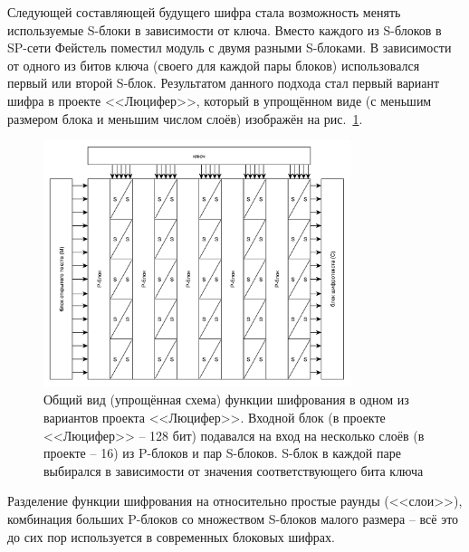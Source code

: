 Следующей составляющей будущего шифра стала возможность менять используемые S-блоки в зависимости от ключа. Вместо каждого из S-блоков в SP-сети Фейстель поместил модуль с двумя разными S-блоками. В зависимости от одного из битов ключа (своего для каждой пары блоков) использовался первый или второй S-блок. Результатом данного подхода стал первый вариант шифра в проекте <<Люцифер>>, который в упрощённом виде (с меньшим размером блока и меньшим числом слоёв) изображён на рис.~\ref{fig:lucifer}.

\begin{figure}[htb]
	\centering
	\includegraphics[width=0.8\textwidth]{pic/lucifer}
  \caption{Общий вид (упрощённая схема) функции шифрования в одном из вариантов проекта <<Люцифер>>. Входной блок (в проекте <<Люцифер>> -- 128 бит) подавался на вход на несколько слоёв (в проекте -- 16) из P-блоков и пар S-блоков. S-блок в каждой паре выбирался в зависимости от значения соответствующего бита ключа}
  \label{fig:lucifer}
\end{figure}

Разделение функции шифрования на относительно простые раунды (<<слои>>), комбинация больших P-блоков со множеством S-блоков малого размера -- всё это до сих пор используется в современных блоковых шифрах.
